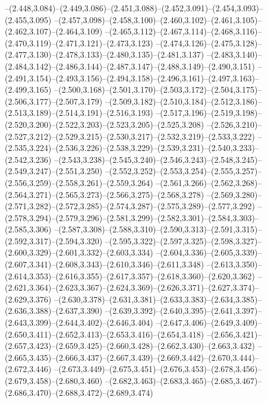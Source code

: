   --(2.448,3.084)--(2.449,3.086)--(2.451,3.088)--(2.452,3.091)--(2.454,3.093)--(2.455,3.095)%
  --(2.457,3.098)--(2.458,3.100)--(2.460,3.102)--(2.461,3.105)--(2.462,3.107)--(2.464,3.109)%
  --(2.465,3.112)--(2.467,3.114)--(2.468,3.116)--(2.470,3.119)--(2.471,3.121)--(2.473,3.123)%
  --(2.474,3.126)--(2.475,3.128)--(2.477,3.130)--(2.478,3.133)--(2.480,3.135)--(2.481,3.137)%
  --(2.483,3.140)--(2.484,3.142)--(2.486,3.144)--(2.487,3.147)--(2.488,3.149)--(2.490,3.151)%
  --(2.491,3.154)--(2.493,3.156)--(2.494,3.158)--(2.496,3.161)--(2.497,3.163)--(2.499,3.165)%
  --(2.500,3.168)--(2.501,3.170)--(2.503,3.172)--(2.504,3.175)--(2.506,3.177)--(2.507,3.179)%
  --(2.509,3.182)--(2.510,3.184)--(2.512,3.186)--(2.513,3.189)--(2.514,3.191)--(2.516,3.193)%
  --(2.517,3.196)--(2.519,3.198)--(2.520,3.200)--(2.522,3.203)--(2.523,3.205)--(2.525,3.208)%
  --(2.526,3.210)--(2.527,3.212)--(2.529,3.215)--(2.530,3.217)--(2.532,3.219)--(2.533,3.222)%
  --(2.535,3.224)--(2.536,3.226)--(2.538,3.229)--(2.539,3.231)--(2.540,3.233)--(2.542,3.236)%
  --(2.543,3.238)--(2.545,3.240)--(2.546,3.243)--(2.548,3.245)--(2.549,3.247)--(2.551,3.250)%
  --(2.552,3.252)--(2.553,3.254)--(2.555,3.257)--(2.556,3.259)--(2.558,3.261)--(2.559,3.264)%
  --(2.561,3.266)--(2.562,3.268)--(2.564,3.271)--(2.565,3.273)--(2.566,3.275)--(2.568,3.278)%
  --(2.569,3.280)--(2.571,3.282)--(2.572,3.285)--(2.574,3.287)--(2.575,3.289)--(2.577,3.292)%
  --(2.578,3.294)--(2.579,3.296)--(2.581,3.299)--(2.582,3.301)--(2.584,3.303)--(2.585,3.306)%
  --(2.587,3.308)--(2.588,3.310)--(2.590,3.313)--(2.591,3.315)--(2.592,3.317)--(2.594,3.320)%
  --(2.595,3.322)--(2.597,3.325)--(2.598,3.327)--(2.600,3.329)--(2.601,3.332)--(2.603,3.334)%
  --(2.604,3.336)--(2.605,3.339)--(2.607,3.341)--(2.608,3.343)--(2.610,3.346)--(2.611,3.348)%
  --(2.613,3.350)--(2.614,3.353)--(2.616,3.355)--(2.617,3.357)--(2.618,3.360)--(2.620,3.362)%
  --(2.621,3.364)--(2.623,3.367)--(2.624,3.369)--(2.626,3.371)--(2.627,3.374)--(2.629,3.376)%
  --(2.630,3.378)--(2.631,3.381)--(2.633,3.383)--(2.634,3.385)--(2.636,3.388)--(2.637,3.390)%
  --(2.639,3.392)--(2.640,3.395)--(2.641,3.397)--(2.643,3.399)--(2.644,3.402)--(2.646,3.404)%
  --(2.647,3.406)--(2.649,3.409)--(2.650,3.411)--(2.652,3.413)--(2.653,3.416)--(2.654,3.418)%
  --(2.656,3.421)--(2.657,3.423)--(2.659,3.425)--(2.660,3.428)--(2.662,3.430)--(2.663,3.432)%
  --(2.665,3.435)--(2.666,3.437)--(2.667,3.439)--(2.669,3.442)--(2.670,3.444)--(2.672,3.446)%
  --(2.673,3.449)--(2.675,3.451)--(2.676,3.453)--(2.678,3.456)--(2.679,3.458)--(2.680,3.460)%
  --(2.682,3.463)--(2.683,3.465)--(2.685,3.467)--(2.686,3.470)--(2.688,3.472)--(2.689,3.474)%
